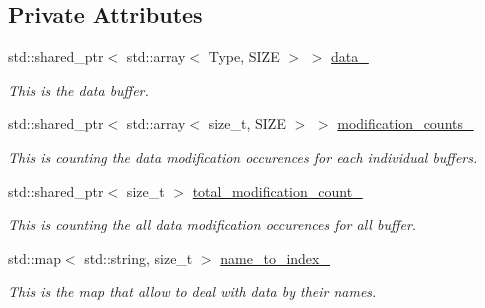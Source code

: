 \subsection*{Private Attributes}
\begin{DoxyCompactItemize}
\item 
\mbox{\label{classreal__time__tools_1_1SingletypeThreadsafeObject_abb449516269c85f927246182abee83ff}} 
std\+::shared\+\_\+ptr$<$ std\+::array$<$ Type, S\+I\+ZE $>$ $>$ \hyperlink{classreal__time__tools_1_1SingletypeThreadsafeObject_abb449516269c85f927246182abee83ff}{data\+\_\+}
\begin{DoxyCompactList}\small\item\em This is the data buffer. \end{DoxyCompactList}\item 
\mbox{\label{classreal__time__tools_1_1SingletypeThreadsafeObject_a7b242bedc7cd23b419d7928e661fdc10}} 
std\+::shared\+\_\+ptr$<$ std\+::array$<$ size\+\_\+t, S\+I\+ZE $>$ $>$ \hyperlink{classreal__time__tools_1_1SingletypeThreadsafeObject_a7b242bedc7cd23b419d7928e661fdc10}{modification\+\_\+counts\+\_\+}
\begin{DoxyCompactList}\small\item\em This is counting the data modification occurences for each individual buffers. \end{DoxyCompactList}\item 
std\+::shared\+\_\+ptr$<$ size\+\_\+t $>$ \hyperlink{classreal__time__tools_1_1SingletypeThreadsafeObject_a3475e1d35b7af07acdbf74c0170ed45d}{total\+\_\+modification\+\_\+count\+\_\+}
\begin{DoxyCompactList}\small\item\em This is counting the all data modification occurences for all buffer. \end{DoxyCompactList}\item 
\mbox{\label{classreal__time__tools_1_1SingletypeThreadsafeObject_a1a27e1934ed7df5119e0e91ca228ac73}} 
std\+::map$<$ std\+::string, size\+\_\+t $>$ \hyperlink{classreal__time__tools_1_1SingletypeThreadsafeObject_a1a27e1934ed7df5119e0e91ca228ac73}{name\+\_\+to\+\_\+index\+\_\+}
\begin{DoxyCompactList}\small\item\em This is the map that allow to deal with data by their names. \end{DoxyCompactList}\item 

\end{DoxyCompactItemize}
